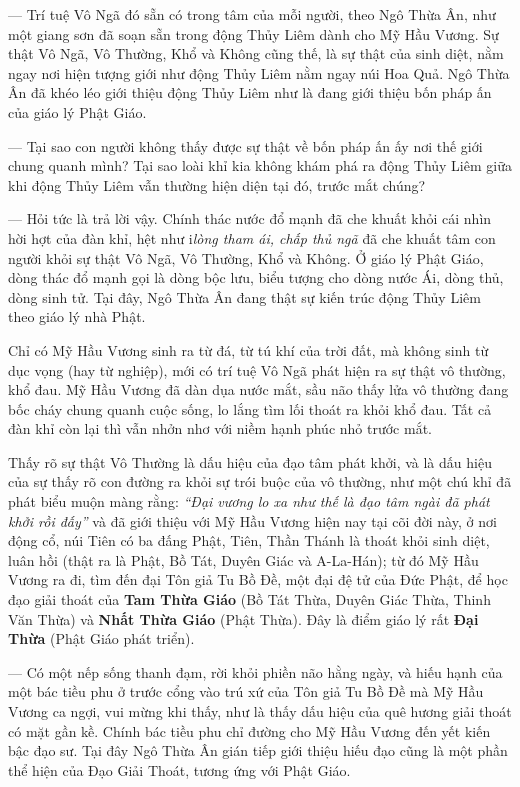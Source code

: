 — Trí tuệ Vô Ngã đó sẵn có trong tâm của mỗi người, theo Ngô Thừa Ân, như một giang sơn đã soạn sẵn trong động Thủy Liêm dành cho Mỹ Hầu Vương. Sự thật Vô Ngã, Vô Thường, Khổ và Không cũng thế, là sự thật của sinh diệt, nằm ngay nơi hiện tượng giới như động Thủy Liêm nằm ngay núi Hoa Quả. Ngô Thừa Ân đã khéo léo giới thiệu động Thủy Liêm như là đang giới thiệu bốn pháp ấn của giáo lý Phật Giáo.

— Tại sao con người không thấy được sự thật về bốn pháp ấn ấy nơi thế giới chung quanh mình? Tại sao loài khỉ kia không khám phá ra động Thủy Liêm giữa khi động Thủy Liêm vẫn thường hiện diện tại đó, trước mắt chúng?

— Hỏi tức là trả lời vậy. Chính thác nước đổ mạnh đã che khuất khỏi cái nhìn hời hợt của đàn khỉ, hệt như i\emph{lòng tham ái, chấp thủ ngã} đã che khuất tâm con người khỏi sự thật Vô Ngã, Vô Thường, Khổ và Không. Ở giáo lý Phật Giáo, dòng thác đổ mạnh gọi là dòng bộc lưu, biểu tượng cho dòng nước Ái, dòng thủ, dòng sinh tử. Tại đây, Ngô Thừa Ân đang thật sự kiến trúc động Thủy Liêm theo giáo lý nhà Phật.

Chỉ có Mỹ Hầu Vương sinh ra từ đá, từ tú khí của trời đất, mà không sinh từ dục vọng (hay từ nghiệp), mới có trí tuệ Vô Ngã phát hiện ra sự thật vô thường, khổ đau. Mỹ Hầu Vương đã dàn dụa nước mắt, sầu não thấy lửa vô thường đang bốc cháy chung quanh cuộc sống, lo lắng tìm lối thoát ra khỏi khổ đau. Tất cả đàn khỉ còn lại thì vẫn nhởn nhơ với niềm hạnh phúc nhỏ trước mắt.

Thấy rõ sự thật Vô Thường là dấu hiệu của đạo tâm phát khởi, và là dấu hiệu của sự thấy rõ con đường ra khỏi sự trói buộc của vô thường, như một chú khỉ đã phát biểu muộn màng rằng: \emph{``Đại vương lo xa như thế là đạo tâm ngài đã phát khởi rồi đấy''} và đã giới thiệu với Mỹ Hầu Vương hiện nay tại cõi đời này, ở nơi động cổ, núi Tiên có ba đấng Phật, Tiên, Thần Thánh là thoát khỏi sinh diệt, luân hồi (thật ra là Phật, Bồ Tát, Duyên Giác và A-La-Hán); từ đó Mỹ Hầu Vương ra đi, tìm đến đại Tôn giả Tu Bồ Đề, một đại đệ tử của Đức Phật, để học đạo giải thoát của {\bf Tam Thừa Giáo} (Bồ Tát Thừa, Duyên Giác Thừa, Thinh Văn Thừa) và {\bf Nhất Thừa Giáo} (Phật Thừa). Đây là điểm giáo lý rất {\bf Đại Thừa} (Phật Giáo phát triển).

— Có một nếp sống thanh đạm, rời khỏi phiền não hằng ngày, và hiếu hạnh của một bác tiều phu ở trước cổng vào trú xứ của Tôn giả Tu Bồ Đề mà Mỹ Hầu Vương ca ngợi, vui mừng khi thấy, như là thấy dấu hiệu của quê hương giải thoát có mặt gần kề. Chính bác tiều phu chỉ đường cho Mỹ Hầu Vương đến yết kiến bậc đạo sư. Tại đây Ngô Thừa Ân gián tiếp giới thiệu hiếu đạo cũng là một phần thể hiện của Đạo Giải Thoát, tương ứng với Phật Giáo.

